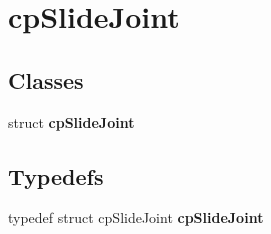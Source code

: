\hypertarget{group__cp_slide_joint}{\section{cp\-Slide\-Joint}
\label{group__cp_slide_joint}
}
\subsection*{Classes}
\begin{DoxyCompactItemize}
\item 
struct {\bfseries cp\-Slide\-Joint}
\end{DoxyCompactItemize}
\subsection*{Typedefs}
\begin{DoxyCompactItemize}
\item 
\hypertarget{group__cp_slide_joint_ga5f79246725c98f970ef5b8a5d2faea26}{typedef struct cp\-Slide\-Joint {\bfseries cp\-Slide\-Joint}}\label{group__cp_slide_joint_ga5f79246725c98f970ef5b8a5d2faea26}

\end{DoxyCompactItemize}
